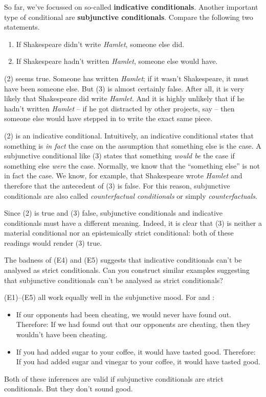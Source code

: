 So far, we've focussed on so-called \textbf{indicative conditionals}. Another
important type of conditional are \textbf{subjunctive conditionals}.
Compare the following two statements.

\begin{enumerate}[leftmargin=10mm]
  \itemsep-1mm
\item[(2)] If Shakespeare didn't write \emph{Hamlet}, someone else did.
\item[(3)] If Shakespeare hadn't written \emph{Hamlet}, someone else would have.
\end{enumerate}
%
(2) seems true. Someone has written \emph{Hamlet}; if it wasn't Shakespeare,
it must have been someone else. But (3) is almost certainly false. After all, it
is very likely that Shakespeare did write \emph{Hamlet}. And it is highly
unlikely that if he hadn't written \emph{Hamlet} -- if he got distracted by
other projects, say -- then someone else would have stepped in to write the
exact same piece.

(2) is an indicative conditional. Intuitively, an indicative conditional states
that something is \emph{in fact} the case on the assumption that something else
is the case. A subjunctive conditional like (3) states that something
\emph{would be} the case if something else \emph{were} the case. Normally, we
know that the ``something else'' is not in fact the case. We know, for example,
that Shakespeare wrote \emph{Hamlet} and therefore that the antecedent of (3) is
false. For this reason, subjunctive conditionals are also called
\emph{counterfactual conditionals} or simply \emph{counterfactuals}.

Since (2) is true and (3) false, subjunctive conditionals and indicative
conditionals must have a different meaning. Indeed, it is clear that (3) is
neither a material conditional nor an epistemically strict conditional: both of
these readings would render (3) true.

\begin{exercise}
  The badness of (E4) and (E5) suggests that indicative conditionals can't be
  analysed as strict conditionals. Can you construct similar examples suggesting
  that subjunctive conditionals can't be analysed as strict conditionals?
\end{exercise}
\begin{solution}
  (E1)--(E5) all work equally well in the subjunctive mood. For  and
  :
  \begin{itemize}
  \item If our opponents had been cheating, we would never have found out.
    Therefore: If we had found out that our opponents are cheating, then
    they wouldn't have been cheating.
  \item If you had added sugar to your coffee, it would have tasted
    good. Therefore: If you had added sugar and vinegar to your coffee, it would
    have tasted good.
  \end{itemize}
  Both of these inferences are valid if subjunctive conditionals are strict
  conditionals. But they don't sound good.
\end{solution}

